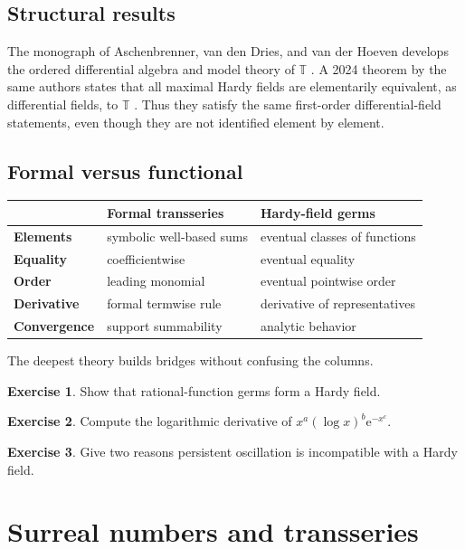 \documentclass[11pt,oneside,openany]{book}
\newcommand{\T}{\mathbb{T}}
\newcommand{\e}{\mathrm{e}}
\theoremstyle{plain}
\theoremstyle{definition}
\newtheorem{exercise}{Exercise}[chapter]
\theoremstyle{remark}
\begin{document}
\section{Structural results}
The monograph of Aschenbrenner, van den Dries, and van der Hoeven develops the ordered differential algebra and model theory of $\T$ \cite{ADH2017}. A 2024 theorem by the same authors states that all maximal Hardy fields are elementarily equivalent, as differential fields, to $\T$ \cite{ADHMaximal2024}. Thus they satisfy the same first-order differential-field statements, even though they are not identified element by element.

\section{Formal versus functional}
\begin{center}
\begin{tabularx}{0.94\textwidth}{>{\bfseries}lXX}
\toprule
 & Formal transseries & Hardy-field germs\\
\midrule
Elements & symbolic well-based sums & eventual classes of functions\\
Equality & coefficientwise & eventual equality\\
Order & leading monomial & eventual pointwise order\\
Derivative & formal termwise rule & derivative of representatives\\
Convergence & support summability & analytic behavior\\
\bottomrule
\end{tabularx}
\end{center}
The deepest theory builds bridges without confusing the columns.

\begin{exercise}
Show that rational-function germs form a Hardy field.
\end{exercise}

\begin{exercise}
Compute the logarithmic derivative of $x^a(\log x)^b\e^{-x^c}$.
\end{exercise}

\begin{exercise}
Give two reasons persistent oscillation is incompatible with a Hardy field.
\end{exercise}


\chapter{Surreal numbers and transseries}
\label{ch:surreal}
\end{document}
